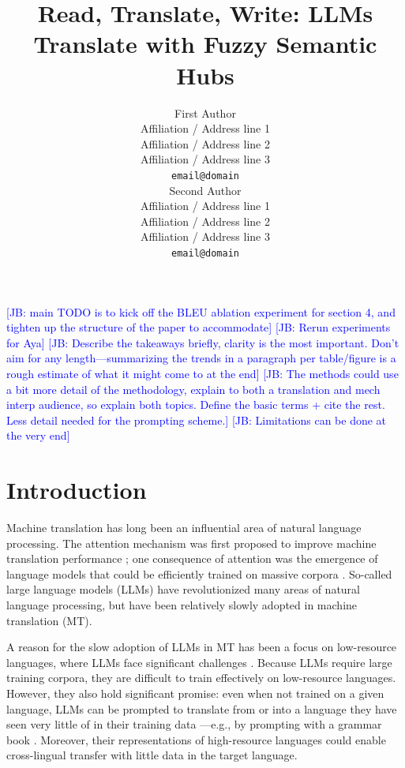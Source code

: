 \documentclass[11pt]{article}
\title{Read, Translate, Write: LLMs Translate with Fuzzy Semantic Hubs}
\author{First Author \\
  Affiliation / Address line 1 \\
  Affiliation / Address line 2 \\
  Affiliation / Address line 3 \\
  \texttt{email@domain} \\\And
  Second Author \\
  Affiliation / Address line 1 \\
  Affiliation / Address line 2 \\
  Affiliation / Address line 3 \\
  \texttt{email@domain} \\}
\newcommand{\jb}[1]{\textcolor{blue}{[JB: #1]}}
\begin{document}
\maketitle
\begin{abstract}

\end{abstract}

\jb{main TODO is to kick off the BLEU ablation experiment for section 4, and tighten up the structure of the paper to accommodate}
\jb{Rerun experiments for Aya}
\jb{Describe the takeaways briefly, clarity is the most important. Don't aim for any length---summarizing the trends in a paragraph per table/figure is a rough estimate of what it might come to at the end}
\jb{The methods could use a bit more detail of the methodology, explain to both a translation and mech interp audience, so explain both topics. Define the basic terms + cite the rest. Less detail needed for the prompting scheme.}
\jb{Limitations can be done at the very end}

\section{Introduction}

Machine translation has long been an influential area of natural language processing. The attention mechanism was first proposed to improve machine translation performance \citep{bahdanau2015neuralmachinetranslationjointly,luong-etal-2015-effective,vaswani2017attention}; one consequence of attention was the emergence of language models that could be efficiently trained on massive corpora \citep{devlin-etal-2019-bert,radford2018improving}. So-called large language models (LLMs) have revolutionized many areas of natural language processing, but have been relatively slowly adopted in machine translation (MT).

A reason for the slow adoption of LLMs in MT has been a focus on low-resource languages, where LLMs face significant challenges \citep{hendy2023goodgptmodelsmachine,robinson2023chatgptmtcompetitivehigh}. Because LLMs require large training corpora, they are difficult to train effectively on low-resource languages. However, they also hold significant promise: even when not trained on a given language, LLMs can be prompted to translate from or into a language they have seen very little of in their training data \citep{cahyawijaya-etal-2024-llms}---e.g., by prompting with a grammar book \citep{tanzer2024a}. Moreover, their representations of high-resource languages could enable cross-lingual transfer \citep{conneau-etal-2020-unsupervised} with little data in the target language.
\end{document}

